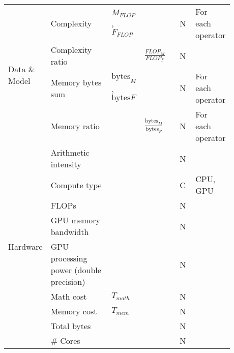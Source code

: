 \begin{tabular}{lp{0.35\linewidth}p{0.10\linewidth}>{\footnotesize}p{0.2\linewidth}p{0.08\linewidth}p{0.15\linewidth}}
    \multirow[t]{4}{*}{Data \& Model}      & Complexity                              & $M_{FLOP}$, $F_{FLOP}$            &                                         & N    & For each operator      \\
                                           & Complexity ratio                        &                                   & $\frac{FLOP_M}{FLOP_F}$                 & N    &                        \\
                                           & Memory bytes sum                        & $\text{bytes}_M$, $\text{bytes}F$ &                                         & N    & For each operator      \\
                                           & Memory ratio                            &                                   & $\frac{\text{bytes}_M}{\text{bytes}_F}$ & N    & For each operator      \\

    \multirow[t]{9}{*}{Hardware}           & Arithmetic intensity                    &                                   &                                         & N    &                        \\
                                           & Compute type                            &                                   &                                         & C    & CPU, GPU               \\
                                           & FLOPs                                   &                                   &                                         & N    &                        \\
                                           & GPU memory bandwidth                    &                                   &                                         & N    &                        \\
                                           & GPU processing power (double precision) &                                   &                                         & N    &                        \\
                                           & Math cost                               & $T_{math}$                        &                                         & N    &                        \\
                                           & Memory cost                             & $T_{mem}$                         &                                         & N    &                        \\
                                           & Total bytes                             &                                   &                                         & N    &                        \\
                                           & \# Cores                                &                                   &                                         & N    &                        \\


\end{tabular}
